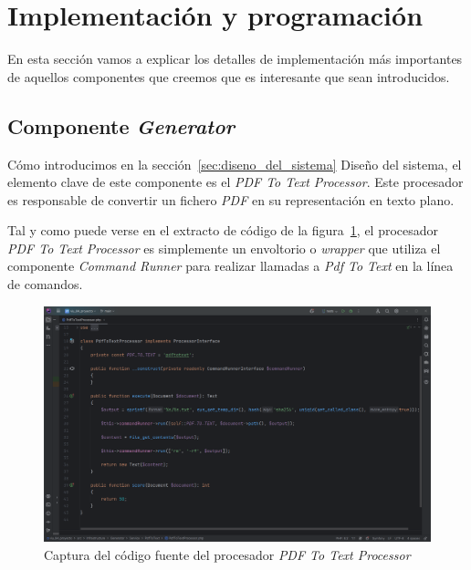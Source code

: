 \section{Implementación y programación}\label{sec:implemetacion_y_programacion}

En esta sección vamos a explicar los detalles de implementación más importantes de aquellos componentes que creemos
que es interesante que sean introducidos.

\subsection*{Componente \textit{Generator}}

Cómo introducimos en la sección~\ref{sec:diseno_del_sistema} Diseño del sistema, el elemento clave de este
componente es el \textit{PDF To Text Processor}.
Este procesador es responsable de convertir un fichero \textit{PDF} en su representación en texto plano.

Tal y como puede verse en el extracto de código de la figura~\ref{fig:chapter_4.4.pdf_to_text_processor}, el procesador
\textit{PDF To Text Processor} es simplemente un envoltorio o \textit{wrapper} que utiliza el componente
\textit{Command Runner} para realizar llamadas a \textit{Pdf To Text} en la línea de comandos.

\begin{figure}[ht]
    \begin{center}
        \includegraphics[width=\textwidth]{./chapter/4/images/chapter_4.4.pdf_to_text_processor}
        \caption{Captura del código fuente del procesador \textit{PDF To Text Processor}}
        \label{fig:chapter_4.4.pdf_to_text_processor}
    \end{center}
\end{figure}

